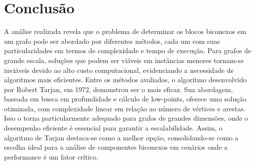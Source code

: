 \documentclass[10pt,conference]{IEEEtran}
\begin{document}
\section{Conclusão}
A análise realizada revela que o problema de determinar os blocos biconexos em um grafo pode ser abordado por diferentes métodos, cada um com suas particularidades em termos de complexidade e tempo de execução. Para grafos de grande escala, soluções que podem ser viáveis em instâncias menores tornam-se inviáveis devido ao alto custo computacional, evidenciando a necessidade de algoritmos mais eficientes. Entre os métodos avaliados, o algoritmo desenvolvido por Robert Tarjan, em 1972, demonstrou ser o mais eficaz. Sua abordagem, baseada em busca em profundidade e cálculo de low-points, oferece uma solução otimizada, com complexidade linear em relação ao número de vértices e arestas. Isso o torna particularmente adequado para grafos de grandes dimensões, onde o desempenho eficiente é essencial para garantir a escalabilidade. Assim, o algoritmo de Tarjan destaca-se como a melhor opção, consolidando-se como a escolha ideal para a análise de componentes biconexos em cenários onde a performance é um fator crítico.

\newpage
\end{document}

